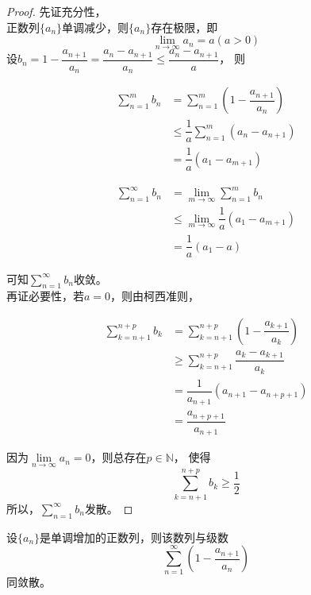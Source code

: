 \begin{proof}
    
    先证充分性，\\
    正数列$\{a_n\}$单调减少，则$\{a_n\}$存在极限，即
    $$\lim\limits_{n\to\infty}{a_n} = a(a>0)$$
    设$b_n=1-\dfrac{a_{n+1}}{a_n} = \dfrac{a_n-a_{n+1}}{a_n}\leq\dfrac{a_n-a_{n+1}}{a}$，
    则

    \begin{align*}
        \sum\limits_{n=1}^{m}{b_n}&=\sum\limits_{n=1}^{m}{(1-\dfrac{a_{n+1}}{a_{n}})}\\
        &\leq\dfrac{1}{a}\sum\limits_{n=1}^{m}{(a_n-a_{n+1})}\\
        &=\dfrac{1}{a}(a_1-a_{m+1})
    \end{align*}

    \begin{align*}
        \sum\limits_{n=1}^{\infty}{b_n} &= \lim\limits_{m\to\infty}{\sum\limits_{n=1}^{m}{b_n}}\\
        &\leq\lim\limits_{m\to\infty}{\dfrac{1}{a}(a_1-a_{m+1})}\\
        & = \dfrac{1}{a}(a_1-a)
    \end{align*}

    可知$\sum\limits_{n=1}^{\infty}{b_n}$收敛。\\
    再证必要性，若$a=0$，则由柯西准则，

    \begin{align*}
        \sum\limits_{k=n+1}^{n+p}{b_k} &= \sum\limits_{k=n+1}^{n+p}{(1-\dfrac{a_{k+1}}{a_k})}\\
        &\geq\sum\limits_{k=n+1}^{n+p}{\dfrac{a_k-a_{k+1}}{a_k}}\\
        & = \dfrac{1}{a_{n+1}}(a_{n+1}-a_{n+p+1})\\
        & = \dfrac{a_{n+p+1}}{a_{n+1}}
    \end{align*}

    因为$\lim\limits_{n\to\infty}{a_n}=0$，则总存在$p \in \mathbb{N}$，
    使得
    $$\sum\limits_{k=n+1}^{n+p}{b_k}\geq\dfrac{1}{2}$$
    所以，$\sum\limits_{n=1}^{\infty}{b_n}$发散。

\end{proof}

\begin{theorem}

    设$\{a_n\}$是单调增加的正数列，则该数列与级数
    $$\sum\limits_{n=1}^{\infty}{\left(1-\dfrac{a_{n+1}}{a_n}\right)}$$
    同敛散。
        
\end{theorem}

